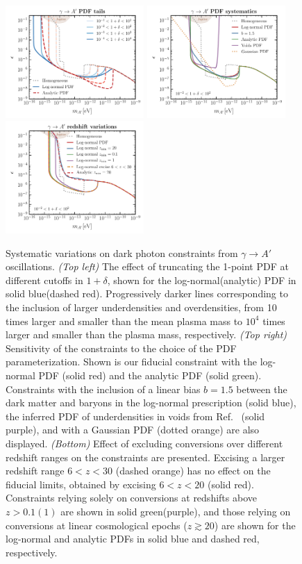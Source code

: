 \documentclass[prd,aps,10pt,nofootinbib,twocolumn,superscriptaddress,preprintnumbers,balancelastpage,longbibliography]{revtex4-1}
\begin{document}
%
\begin{figure}[tbp]
    \centering
    \includegraphics[width=0.47\textwidth]{plots/limit_dp_pdf_tails}
    \includegraphics[width=0.47\textwidth]{plots/limit_dp_pdfs}
    \includegraphics[width=0.47\textwidth]{plots/limit_dp_redshifts}
    \caption{Systematic variations on dark photon constraints from $\gamma\to A'$ oscillations. \emph{(Top left)} The effect of truncating the 1-point PDF at different cutoffs in $1 + \delta$, shown for the log-normal(analytic) PDF in solid blue(dashed red). Progressively darker lines corresponding to the inclusion of larger underdensities and overdensities, from 10 times larger and smaller than the mean plasma mass to $10^4$ times larger and smaller than the plasma mass, respectively. \emph{(Top right)} Sensitivity of the constraints to the choice of the PDF parameterization. Shown is our fiducial constraint with the log-normal PDF (solid red) and the analytic PDF (solid green). Constraints with the inclusion of a linear bias $b=1.5$ between the dark matter and baryons in the log-normal prescription (solid blue), the inferred PDF of underdensities in voids from Ref.~\cite{Adermann:2018jba} (solid purple), and with a Gaussian PDF (dotted orange) are also displayed. \emph{(Bottom)} Effect of excluding conversions over different redshift ranges on the constraints are presented. Excising a larger redshift range $6 < z < 30$ (dashed orange) has no effect on the fiducial limits, obtained by excising $6 < z < 20$ (solid red). Constraints relying solely on conversions at redshifts above $z > 0.1(1)$ are shown in solid green(purple), and those relying on conversions at linear cosmological epochs ($z \gtrsim 20$) are shown for the log-normal and analytic PDFs in solid blue and dashed red, respectively.~} 

\end{figure}
\end{document}
